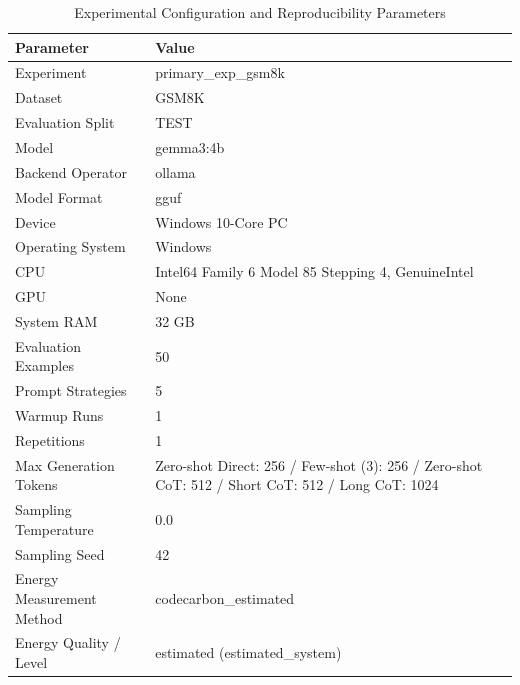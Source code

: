 \begin{table}
\caption{Experimental Configuration and Reproducibility Parameters}
\label{tab:experimental_configuration}
\begin{tabular}{ll}
\toprule
Parameter & Value \\
\midrule
Experiment & primary\_exp\_gsm8k \\
Dataset & GSM8K \\
Evaluation Split & TEST \\
Model & gemma3:4b \\
Backend Operator & ollama \\
Model Format & gguf \\
Device & Windows 10-Core PC \\
Operating System & Windows \\
CPU & Intel64 Family 6 Model 85 Stepping 4, GenuineIntel \\
GPU & None \\
System RAM & 32 GB \\
Evaluation Examples & 50 \\
Prompt Strategies & 5 \\
Warmup Runs & 1 \\
Repetitions & 1 \\
Max Generation Tokens & Zero-shot Direct: 256 / Few-shot (3): 256 / Zero-shot CoT: 512 / Short CoT: 512 / Long CoT: 1024 \\
Sampling Temperature & 0.0 \\
Sampling Seed & 42 \\
Energy Measurement Method & codecarbon\_estimated \\
Energy Quality / Level & estimated (estimated\_system) \\
\bottomrule
\end{tabular}
\end{table}
